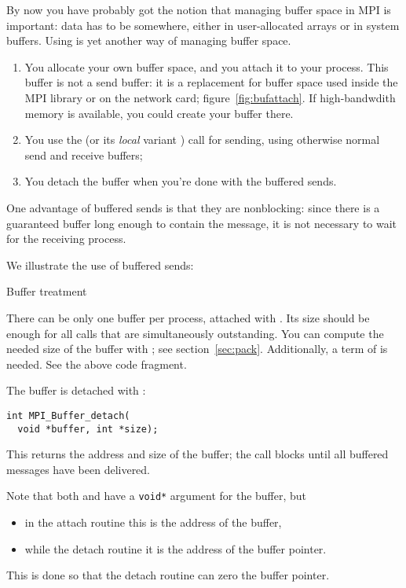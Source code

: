 By now you have probably got the notion that managing buffer
space in MPI is important: data has to be somewhere, either in
user-allocated arrays or in system buffers. Using
 is yet another
way of managing buffer space.
\begin{enumerate}
\item You allocate your own buffer space, and you attach it to your
  process. This buffer is not a send buffer: it is a replacement for
  buffer space used inside the MPI library or on the network card;
  figure~\ref{fig:bufattach}. If high-bandwdith memory is available,
  you could create your buffer there.
\item You use the 
  (or its \emph{local} variant )
  call for sending, using
  otherwise normal send and receive buffers;
\item You detach the buffer when you're done with the buffered sends.
\end{enumerate}

One advantage of buffered sends is that they are nonblocking:
since there is a guaranteed buffer long enough to contain the
message, it is not necessary to wait for the receiving process.

We illustrate the use of buffered sends:


 {Buffer treatment}

There can be only one buffer per process, attached with
.
Its size should be enough
for all  calls that are simultaneously
outstanding.
You can compute the needed size of the buffer with ;
see section~\ref{sec:pack}.
Additionally, a term of  is needed.
See the above code fragment.

The buffer is detached with :
\begin{lstlisting}
int MPI_Buffer_detach(
  void *buffer, int *size);
\end{lstlisting}
This returns the address and size of the buffer; the call blocks
until all buffered messages have been delivered.

Note that both
 and 
have a \lstinline+void*+ argument for the buffer, but 
\begin{itemize}
\item in the attach routine this is the address of the buffer,
\item while the detach routine it is the address of the buffer pointer.
\end{itemize}
This is done so that the detach routine can zero the buffer pointer.

